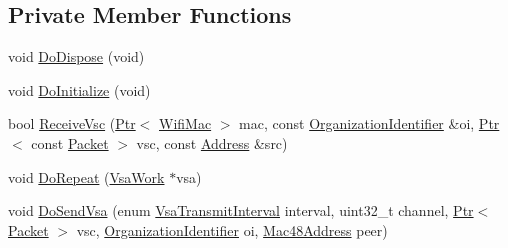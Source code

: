 \subsection*{Private Member Functions}
\begin{DoxyCompactItemize}
\item 
void \hyperlink{classns3_1_1VsaManager_a36e46be212cd99de74d78ec1494f8476}{Do\+Dispose} (void)
\item 
void \hyperlink{classns3_1_1VsaManager_a05e003d4c898eda681aeb6c2a4339e2a}{Do\+Initialize} (void)
\item 
bool \hyperlink{classns3_1_1VsaManager_a5dd6b3883b8e57ed8cc7f7cc7afa5601}{Receive\+Vsc} (\hyperlink{classns3_1_1Ptr}{Ptr}$<$ \hyperlink{classns3_1_1WifiMac}{Wifi\+Mac} $>$ mac, const \hyperlink{classns3_1_1OrganizationIdentifier}{Organization\+Identifier} \&oi, \hyperlink{classns3_1_1Ptr}{Ptr}$<$ const \hyperlink{classns3_1_1Packet}{Packet} $>$ vsc, const \hyperlink{classns3_1_1Address}{Address} \&src)
\item 
void \hyperlink{classns3_1_1VsaManager_a5731f78c47436e8cb495052b1fe42f65}{Do\+Repeat} (\hyperlink{structns3_1_1VsaManager_1_1VsaWork}{Vsa\+Work} $\ast$vsa)
\item 
void \hyperlink{classns3_1_1VsaManager_a3d56f68f3b98bd45ccc6c56c9a6244db}{Do\+Send\+Vsa} (enum \hyperlink{namespacens3_a417ab130a77d452a8b5014090665bcc1}{Vsa\+Transmit\+Interval} interval, uint32\+\_\+t channel, \hyperlink{classns3_1_1Ptr}{Ptr}$<$ \hyperlink{classns3_1_1Packet}{Packet} $>$ vsc, \hyperlink{classns3_1_1OrganizationIdentifier}{Organization\+Identifier} oi, \hyperlink{classns3_1_1Mac48Address}{Mac48\+Address} peer)
\end{DoxyCompactItemize}
